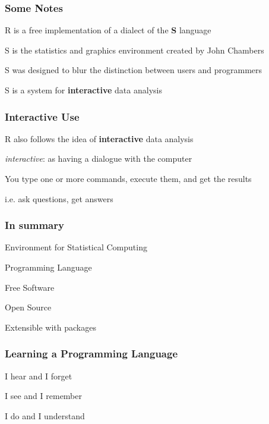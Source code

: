 \documentclass[12pt]{beamer}\usepackage[]{graphicx}\usepackage[]{color}
\begin{document}

\begin{frame}
\frametitle{Some Notes}

\bbi
  \item R is a free implementation of a dialect of the \textbf{S} language
  \item S is the statistics and graphics environment created by John Chambers 
  \item S was designed to blur the distinction between users and programmers
  \item S is a system for \textbf{interactive} data analysis
\ei

\end{frame}


\begin{frame}
\frametitle{Interactive Use}

\bbi
  \item R also follows the idea of \textbf{interactive} data analysis
  \item \textit{interactive}: as having a dialogue with the computer
  \item You type one or more commands, execute them, and get the results
  \item i.e. ask questions, get answers
\ei

\end{frame}


\begin{frame}
\frametitle{In summary}

\bi
  \item Environment for Statistical Computing
  \item Programming Language
  \item Free Software
  \item Open Source
  \item Extensible with packages
\ei

\end{frame}


\begin{frame}
\frametitle{Learning a Programming Language}

\bbi
  \item I hear and I forget
  \item I see and I remember
  \item I do and I understand
\ei
\eb

\end{frame}
\end{document}
